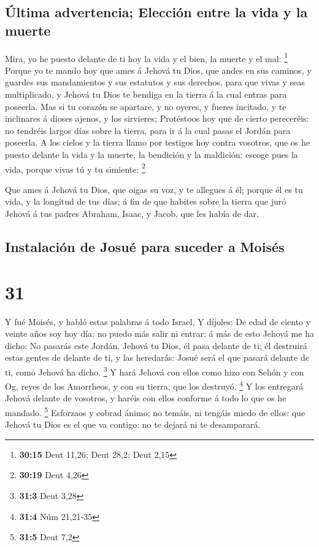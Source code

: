 \hypertarget{uxfaltima-advertencia-elecciuxf3n-entre-la-vida-y-la-muerte}{%
\subsection{Última advertencia; Elección entre la vida y la
muerte}\label{uxfaltima-advertencia-elecciuxf3n-entre-la-vida-y-la-muerte}}

 Mira, yo he puesto delante de ti hoy la vida y el bien, la
muerte y el mal: \footnote{\textbf{30:15} Deut 11,26; Deut 28,2; Deut
  2,15}  Porque yo te mando hoy que ames á Jehová tu Dios,
que andes en sus caminos, y guardes sus mandamientos y sus estatutos y
sus derechos, para que vivas y seas multiplicado, y Jehová tu Dios te
bendiga en la tierra á la cual entras para poseerla.  Mas
si tu corazón se apartare, y no oyeres, y fueres incitado, y te
inclinares á dioses ajenos, y los sirvieres;  Protéstoos
hoy que de cierto pereceréis: no tendréis largos días sobre la tierra,
para ir á la cual pasas el Jordán para poseerla.  A los
cielos y la tierra llamo por testigos hoy contra vosotros, que os he
puesto delante la vida y la muerte, la bendición y la maldición: escoge
pues la vida, porque vivas tú y tu simiente: \footnote{\textbf{30:19}
  Deut 4,26}

 Que ames á Jehová tu Dios, que oigas su voz, y te allegues
á él; porque él es tu vida, y la longitud de tus días; á fin de que
habites sobre la tierra que juró Jehová á tus padres Abraham, Isaac, y
Jacob, que les había de dar.

\hypertarget{instalaciuxf3n-de-josuuxe9-para-suceder-a-moisuxe9s}{%
\subsection{Instalación de Josué para suceder a
Moisés}\label{instalaciuxf3n-de-josuuxe9-para-suceder-a-moisuxe9s}}

\hypertarget{section-30}{%
\section{31}\label{section-30}}

 Y fué Moisés, y habló estas palabras á todo Israel,
 Y díjoles: De edad de ciento y veinte años soy hoy día; no
puedo más salir ni entrar: á más de esto Jehová me ha dicho: No pasarás
este Jordán.  Jehová tu Dios, él pasa delante de ti; él
destruirá estas gentes de delante de ti, y las heredarás: Josué será el
que pasará delante de ti, como Jehová ha dicho. \footnote{\textbf{31:3}
  Deut 3,28}  Y hará Jehová con ellos como hizo con Sehón y
con Og, reyes de los Amorrheos, y con su tierra, que los destruyó.
\footnote{\textbf{31:4} Núm 21,21-35}  Y los entregará
Jehová delante de vosotros, y haréis con ellos conforme á todo lo que os
he mandado. \footnote{\textbf{31:5} Deut 7,2}  Esforzaos y
cobrad ánimo; no temáis, ni tengáis miedo de ellos: que Jehová tu Dios
es el que va contigo: no te dejará ni te desamparará.

